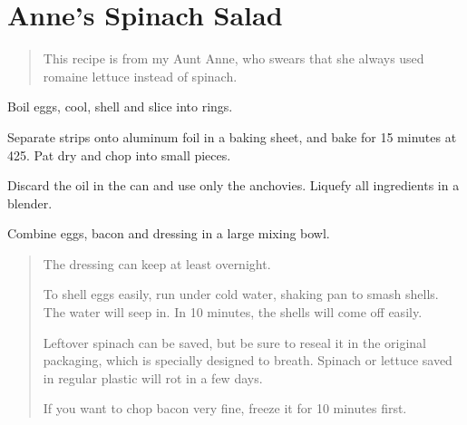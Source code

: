 
\section{Anne's Spinach Salad}
\begin{recipe}

\begin{quote}
    This recipe is from my Aunt Anne, who swears that she always used romaine lettuce instead of spinach.
\end{quote}


Boil eggs, cool, shell and slice into rings.


Separate strips onto aluminum foil in a baking sheet, and bake for 15 minutes at 425. Pat dry and chop into small pieces.


Discard the oil in the can and use only the anchovies. Liquefy all  ingredients in a blender.


Combine eggs, bacon and dressing in a large mixing bowl.

\begin{quote}
The dressing can keep at least overnight.

To shell eggs easily, run under cold water, shaking pan to smash shells. The water will seep in. In 10 minutes, the shells will come off easily.

Leftover spinach can be saved, but be sure to reseal it in the original packaging, which is specially designed to breath. Spinach or lettuce saved in regular plastic will rot in a few days.

If you want to chop bacon very fine, freeze it for 10 minutes first.
\end{quote}

\end{recipe}
